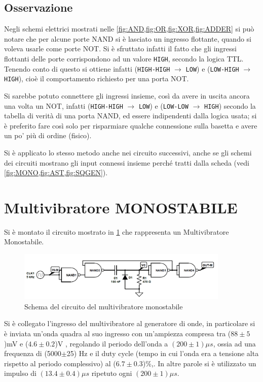 \documentclass[a4paper,10pt]{article}
\def\code#1{\texttt{#1}}
\begin{document}
\subsection{Osservazione} 

Negli schemi elettrici mostrati nelle \cref{fig:AND,fig:OR,fig:XOR,fig:ADDER} si può notare che per alcune porte NAND si è lasciato un ingresso flottante, quando si voleva usarle come porte NOT. Si è sfruttato infatti il fatto che gli ingressi flottanti delle porte corrispondono ad un valore \code{HIGH}, secondo la logica TTL.
Tenendo conto di questo si ottiene infatti (\code{HIGH-HIGH} $\rightarrow$ \code{LOW}) e (\code{LOW-HIGH} $\rightarrow$ \code{HIGH}), cioè il comportamento richiesto per una porta NOT.

Si sarebbe potuto connettere gli ingressi insieme, così da avere in uscita ancora una volta un NOT, infatti (\code{HIGH-HIGH} $\rightarrow$ \code{LOW}) e (\code{LOW-LOW} $\rightarrow$ \code{HIGH}) secondo la tabella di verità di una porta NAND, ed essere indipendenti dalla logica usata; si è preferito fare così solo per risparmiare qualche connessione sulla basetta e avere un po' più di ordine (fisico).

Si è applicato lo stesso metodo anche nei circuito successivi, anche se gli schemi dei circuiti mostrano gli input connessi insieme perché tratti dalla scheda (vedi \cref{fig:MONO,fig:AST,fig:SQGEN}).


\section{Multivibratore MONOSTABILE}
Si è montato il circuito mostrato in \cref{fig:MONO} che rappresenta un Multivibratore Monostabile. 


\begin{figure}[H]
	\centering
	\includegraphics[width=0.9\textwidth]{../grafici/Monostabile.png}
	\caption{Schema del circuito del multivibratore monostabile}
	\label{fig:MONO}
\end{figure}


Si è collegato l'ingresso del multivibratore al generatore di onde, in particolare si è inviata un'onda quadra al suo ingresso con un'ampiezza compresa tra ($88\pm5$)mV e ($4.6\pm0.2$)V , regolando il periodo dell'onda a $(200\pm 1) \mu s$, ossia ad una frequenza di (5000$\pm$25) Hz e il duty cycle (tempo in cui l'onda era a tensione alta rispetto al periodo complessivo) al ($6.7\pm0.3$)\%,. In altre parole si è utilizzato un impulso di $(13.4\pm0.4) \mu s$ ripetuto ogni $(200\pm1) \mu s$.
\end{document}
